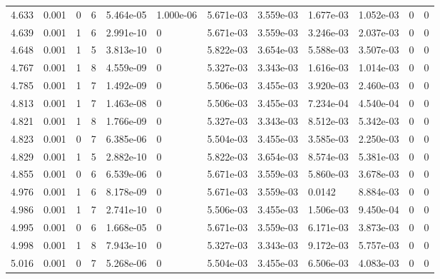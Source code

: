 \documentclass[preview]{standalone}
\begin{document}
{{{{\begin{tabular}{L{1.2cm}C{1.2cm} C{0.3cm}C{0.5cm} C{1.4cm}C{1.4cm} C{1.4cm}C{1.4cm} C{1.6cm}C{1.6cm} C{1.6cm}C{1.6cm}}
  4.633  &  0.001  & 0     &  6 &  5.464e-05  & 1.000e-06  &  5.671e-03&   3.559e-03& 1.677e-03 & 1.052e-03   &  0 & 0  \\ 
  4.639  &  0.001  & 1     &  6 &  2.991e-10  & 0  &  5.671e-03&   3.559e-03& 3.246e-03 & 2.037e-03   &  0 & 0  \\ 
  4.648  &  0.001  & 1     &  5 &  3.813e-10  & 0  &  5.822e-03&   3.654e-03& 5.588e-03 & 3.507e-03   &  0 & 0  \\ 
  4.767  &  0.001  & 1     &  8 &  4.559e-09  & 0  &  5.327e-03&   3.343e-03& 1.616e-03 & 1.014e-03   &  0 & 0  \\ 
  4.785  &  0.001  & 1     &  7 &  1.492e-09  & 0  &  5.506e-03&   3.455e-03& 3.920e-03 & 2.460e-03   &  0 & 0  \\ 
  4.813  &  0.001  & 1     &  7 &  1.463e-08  & 0  &  5.506e-03&   3.455e-03& 7.234e-04 & 4.540e-04   &  0 & 0  \\ 
  4.821  &  0.001  & 1     &  8 &  1.766e-09  & 0  &  5.327e-03&   3.343e-03& 8.512e-03 & 5.342e-03   &  0 & 0  \\ 
  4.823  &  0.001  & 0     &  7 &  6.385e-06  & 0  &  5.504e-03&   3.455e-03& 3.585e-03 & 2.250e-03   &  0 & 0  \\ 
  4.829  &  0.001  & 1     &  5 &  2.882e-10  & 0  &  5.822e-03&   3.654e-03& 8.574e-03 & 5.381e-03   &  0 & 0  \\ 
  4.855  &  0.001  & 0     &  6 &  6.539e-06  & 0  &  5.671e-03&   3.559e-03& 5.860e-03 & 3.678e-03   &  0 & 0  \\ 
  4.976  &  0.001  & 1     &  6 &  8.178e-09  & 0  &  5.671e-03&   3.559e-03& 0.0142 & 8.884e-03   &  0 & 0  \\ 
  4.986  &  0.001  & 1     &  7 &  2.741e-10  & 0  &  5.506e-03&   3.455e-03& 1.506e-03 & 9.450e-04   &  0 & 0  \\ 
  4.995  &  0.001  & 0     &  6 &  1.668e-05  & 0  &  5.671e-03&   3.559e-03& 6.171e-03 & 3.873e-03   &  0 & 0  \\ 
  4.998  &  0.001  & 1     &  8 &  7.943e-10  & 0  &  5.327e-03&   3.343e-03& 9.172e-03 & 5.757e-03   &  0 & 0  \\ 
  5.016  &  0.001  & 0     &  7 &  5.268e-06  & 0  &  5.504e-03&   3.455e-03& 6.506e-03 & 4.083e-03   &  0 & 0  \\ 
\hline 
\end{tabular} 

}}}}
\end{document}

